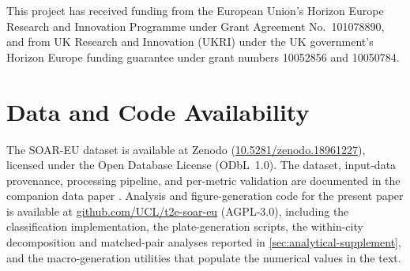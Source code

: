 \documentclass[review,authoryear]{elsarticle}
\begin{document}
This project has received funding from the European Union's Horizon Europe Research and Innovation Programme under Grant Agreement No.\ 101078890, and from UK Research and Innovation (UKRI) under the UK government's Horizon Europe funding guarantee under grant numbers 10052856 and 10050784.

\section*{Data and Code Availability}

The SOAR-EU dataset is available at Zenodo (\href{https://doi.org/10.5281/zenodo.18961227}{10.5281/zenodo.18961227}), licensed under the Open Database License (ODbL~1.0). The dataset, input-data provenance, processing pipeline, and per-metric validation are documented in the companion data paper \citep{simons2024soar}. Analysis and figure-generation code for the present paper is available at \href{https://github.com/UCL/t2e-soar-eu}{github.com/UCL/t2e-soar-eu} (AGPL-3.0), including the classification implementation, the plate-generation scripts, the within-city decomposition and matched-pair analyses reported in \ref{sec:analytical-supplement}, and the macro-generation utilities that populate the numerical values in the text.



% 
\end{document}
